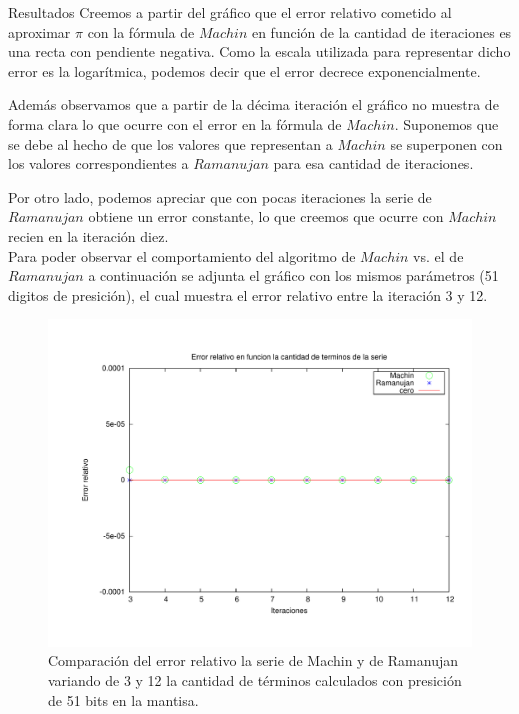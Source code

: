 \begin{section}{Resultados}
	Creemos a partir del gráfico que el error relativo cometido al aproximar $\pi$ con la fórmula de $Machin$ en función de la cantidad de iteraciones es una recta con pendiente negativa. Como la escala utilizada para representar dicho error es la logarítmica, podemos decir que el error decrece exponencialmente.
	
	Además observamos que a partir de la décima iteración el gráfico no muestra de forma clara lo que ocurre con el error en la fórmula de $Machin$. Suponemos que se debe al hecho de que los valores que representan a $Machin$ se superponen con los valores correspondientes a $Ramanujan$ para esa cantidad de iteraciones.
	
	Por otro lado, podemos apreciar que con pocas iteraciones la serie de $Ramanujan$ obtiene un error constante, lo que creemos que ocurre con $Machin$ recien en la iteración diez.\\
	
	Para poder observar el comportamiento del algoritmo de $Machin$ vs. el de $Ramanujan$ a continuación se adjunta el gráfico con los mismos parámetros (51 digitos de presición), el cual muestra el error relativo entre la iteración 3 y 12.
	
	\begin{figure}[H]
	  \centering
		\includegraphics[width=14cm]{graficos/comparacion_machin-ram.pdf}
	  \caption{Comparación del error relativo la serie de Machin y de Ramanujan variando de 3 y 12 la cantidad de términos calculados con presición de 51 bits en la mantisa.}
	  \label{fig:greg-ram}
	\end{figure}
	

\end{section}
